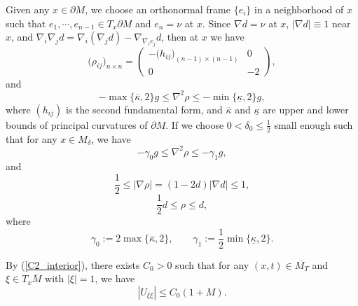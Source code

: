 \documentclass[12pt]{amsart}
\theoremstyle{definition}
\theoremstyle{remark}
\numberwithin{equation}{section}
\begin{document}
Given any $x \in \partial M$, we choose an orthonormal frame $\{e_i\}$ in a neighborhood of $x$ such that $e_1, \cdots, e_{n-1} \in T_{x}\partial M$ and $e_n = \nu$ at $x$. Since $\nabla d = \nu$ at $x$, $|\nabla d| \equiv 1$ near $x$, and $\nabla_i \nabla_j d = \nabla_i (\nabla_j d) - \nabla_{\nabla_i e_j}d$, then at $x$ we have
\begin{equation}
\big(\rho_{ij}\big)_{n\times n} = \begin{pmatrix} 
-\big( h_{ij}\big)_{(n-1)\times (n-1)} & 0 \\
0 & -2 
\end{pmatrix},
\end{equation}
and
\begin{equation}
-\max\{\overline{\kappa}, 2\} g \leq \nabla^2 \rho \leq - \min\{ \underline{\kappa}, 2 \} g,
\end{equation}
where $(h_{ij})$ is the second fundamental form, and $\overline{\kappa}$ and $\underline{\kappa}$ are upper and lower bounds of principal curvatures of $\partial M$. 
If we choose $0 < \delta_0 \leq \frac{1}{2}$ small enough such that for any $x\in M_\delta$, we have
\begin{equation}
-\gamma_0 g \leq \nabla^2 \rho \leq - \gamma_1 g,
\end{equation}
and
\begin{equation}
\frac{1}{2} \leq |\nabla \rho| = (1 - 2d) |\nabla d| \leq 1,
\end{equation}
\begin{equation}
\frac{1}{2}d \leq \rho \leq d,
\end{equation}
where
$$\gamma_0 := 2\max\{\overline{\kappa}, 2\}, \qquad \gamma_1 := \frac{1}{2}\min\{ \underline{\kappa}, 2 \}.$$


By (\ref{C2_interior}), there exists $C_0 > 0$ such that for any $(x, t) \in \overline{M_T}$ and $\xi \in T_x \overline{M}$ with $|\xi| = 1$, we have
\begin{equation}\label{C2_nn_0}
|U_{\xi\xi}| \leq C_0 (1 + M).
\end{equation}
\end{document}

